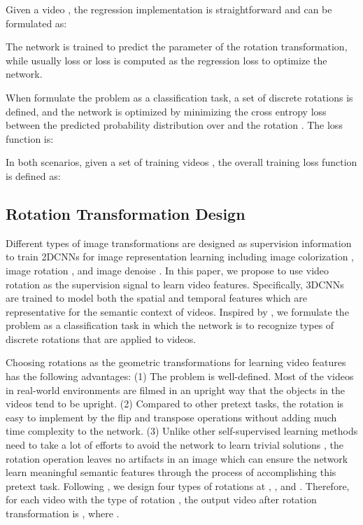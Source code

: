 \documentclass[10pt,twocolumn,letterpaper]{article}
\begin{document}
Given a video , the regression implementation is straightforward and can be formulated as: 

 
The network  is trained to predict the parameter  of the rotation transformation, while usually  loss or  loss is computed as the regression loss to optimize the network.





When formulate the problem as a classification task, a set of  discrete rotations is defined, and the network  is optimized by minimizing the cross entropy loss between the predicted probability distribution over  and the rotation . The loss function is:

In both scenarios, given  a  set  of  training videos , the overall training loss function is defined as:


\subsection{Rotation Transformation Design} 

Different types of image transformations are designed as supervision information to train 2DCNNs for image representation learning including image colorization \cite{larsson2017colorproxy}, image rotation \cite{rotation}, and image denoise \cite{predictnoise}. In this paper, we propose to use video rotation as the supervision signal to learn video features. Specifically, 3DCNNs are trained to model both the spatial and temporal features which are representative for the semantic context of videos. Inspired by \cite{rotation, larsson2017colorproxy}, we formulate the problem as a classification task in which the network is to recognize  types of discrete rotations that are applied to videos.

Choosing rotations as the geometric transformations for learning video features has the following advantages: (1) The problem is well-defined. Most of the videos in real-world environments are filmed in an upright way that the objects in the videos tend to be upright. (2) Compared to other pretext tasks, the rotation is easy to implement by the flip and transpose operations without adding much time complexity to the network. (3) Unlike other self-supervised learning methods need to take a lot of efforts to avoid the network to learn trivial solutions \cite{contextprediction}, the rotation operation leaves no artifacts in an image which can ensure the network learn meaningful semantic features through the process of accomplishing this pretext task. Following \cite{rotation}, we design four types of rotations at , ,  and . Therefore, for each video  with the type of rotation , the output video after rotation transformation is , where .
\end{document}
